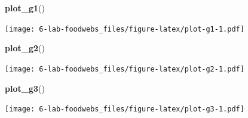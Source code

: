 \documentclass[
]{article}
\newenvironment{Shaded}{\begin{snugshade}}{\end{snugshade}}
\newcommand{\FunctionTok}[1]{\textcolor[rgb]{0.13,0.29,0.53}{\textbf{#1}}}
\newcommand{\NormalTok}[1]{#1}
\begin{document}
\begin{Shaded}
\begin{Highlighting}[]
\FunctionTok{plot\_g1}\NormalTok{()}
\end{Highlighting}
\end{Shaded}

\texttt{[image: 6-lab-foodwebs\_files/figure-latex/plot-g1-1.pdf]}

\begin{Shaded}
\begin{Highlighting}[]
\FunctionTok{plot\_g2}\NormalTok{()}
\end{Highlighting}
\end{Shaded}

\texttt{[image: 6-lab-foodwebs\_files/figure-latex/plot-g2-1.pdf]}

\begin{Shaded}
\begin{Highlighting}[]
\FunctionTok{plot\_g3}\NormalTok{()}
\end{Highlighting}
\end{Shaded}

\texttt{[image: 6-lab-foodwebs\_files/figure-latex/plot-g3-1.pdf]}
\end{document}
